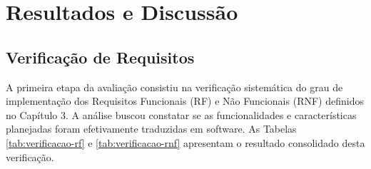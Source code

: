 

\chapter{Resultados e Discussão}\label{cha:resultados}

\section{Verificação de Requisitos}

A primeira etapa da avaliação consistiu na verificação sistemática do grau de implementação dos Requisitos Funcionais (RF) e Não Funcionais (RNF) definidos no Capítulo 3. A análise buscou constatar se as funcionalidades e características planejadas foram efetivamente traduzidas em software. As Tabelas \ref{tab:verificacao-rf} e \ref{tab:verificacao-rnf} apresentam o resultado consolidado desta verificação.

